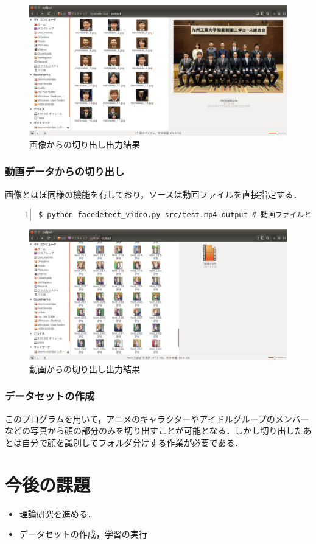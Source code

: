 \documentclass[a4paper,10pt]{jsarticle}
\begin{document}
\begin{figure}[t]
  \begin{center}
    \includegraphics[width=14cm]{fig/eps/facedetection.eps}
  \end{center}
  \caption{画像からの切り出し出力結果}
  \label{fig:画像からの切り出し出力結果}
\end{figure}

\subsubsection{動画データからの切り出し}
画像とほぼ同様の機能を有しており，ソースは動画ファイルを直接指定する．

\begin{lstlisting}[basicstyle=\ttfamily\footnotesize, frame=single, firstnumber=1, numbers=left, breaklines=true]
$ python facedetect_video.py src/test.mp4 output # 動画ファイルと出力先ディレクトリ
\end{lstlisting}

\begin{figure}[t]
  \begin{center}
    \includegraphics[width=14cm]{fig/eps/facedetection_video.eps}
  \end{center}
  \caption{動画からの切り出し出力結果}
  \label{fig:動画からの切り出し出力結果}
\end{figure}

\subsubsection{データセットの作成}
このプログラムを用いて，アニメのキャラクターやアイドルグループのメンバーなどの写真から顔の部分のみを切り出すことが可能となる．しかし切り出したあとは自分で顔を識別してフォルダ分けする作業が必要である．

\section{今後の課題}
\begin{itemize}
 \item 理論研究を進める．
 \item データセットの作成，学習の実行
\end{itemize}
\end{document}
